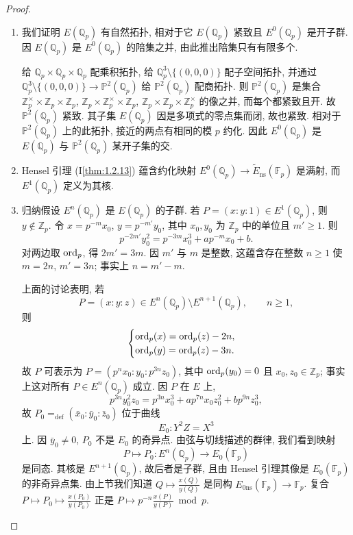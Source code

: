 \begin{proof}\begin{enumerate}[label=\textup{(\alph*)}]

\item 我们证明 $E(\mathbb{Q}_p)$ 有自然拓扑, 相对于它 $E(\mathbb{Q}_p)$ 紧致且 $E^0(\mathbb{Q}_p)$ 是开子群. 因 $E(\mathbb{Q}_p)$ 是 $E^0(\mathbb{Q}_p)$ 的陪集之并, 由此推出陪集只有有限多个.

给 $\mathbb{Q}_p\times\mathbb{Q}_p\times\mathbb{Q}_p$ 配乘积拓扑, 给 $\mathbb{Q}_p^3\setminus\{(0,0,0)\}$ 配子空间拓扑, 并通过 $\mathbb{Q}_p^3\setminus\{(0,0,0)\}\to\mathbb{P}^2(\mathbb{Q}_p)$ 给 $\mathbb{P}^2(\mathbb{Q}_p)$ 配商拓扑. 则 $\mathbb{P}^2(\mathbb{Q}_p)$ 是集合 $\mathbb{Z}_p^{\times}\times\mathbb{Z}_p\times\mathbb{Z}_p$, $\mathbb{Z}_p\times\mathbb{Z}_p^{\times}\times\mathbb{Z}_p$, $\mathbb{Z}_p\times\mathbb{Z}_p\times\mathbb{Z}_p^{\times}$ 的像之并, 而每个都紧致且开. 故 $\mathbb{P}^2(\mathbb{Q}_p)$ 紧致. 其子集 $E(\mathbb{Q}_p)$ 因是多项式的零点集而闭, 故也紧致. 相对于 $\mathbb{P}^2(\mathbb{Q}_p)$ 上的此拓扑, 接近的两点有相同的模 $p$ 约化. 因此 $E^0(\mathbb{Q}_p)$ 是 $E(\mathbb{Q}_p)$ 与 $\mathbb{P}^2(\mathbb{Q}_p)$ 某开子集的交.

\item Hensel 引理 (I\ref{thm:1.2.13}) 蕴含约化映射 $E^0(\mathbb{Q}_p)\to\tilde{E}_{\mathrm{ns}}(\mathbb{F}_p)$ 是满射, 而 $E^1(\mathbb{Q}_p)$ 定义为其核.

\item 归纳假设 $E^n(\mathbb{Q}_p)$ 是 $E(\mathbb{Q}_p)$ 的子群. 若 $P = (x:y:1)\in E^1(\mathbb{Q}_p)$, 则 $y\notin\mathbb{Z}_p$. 令 $x = p^{-m}x_0$, $y = p^{-m'}y_0$, 其中 $x_0, y_0$ 为 $\mathbb{Z}_p$ 中的单位且 $m'\ge 1$. 则
\[
p^{-2m'}y_0^2 = p^{-3m}x_0^3 + ap^{-m}x_0 + b.
\]
对两边取 $\operatorname*{ord}\nolimits_p$, 得 $2m' = 3m$. 因 $m'$ 与 $m$ 是整数, 这蕴含存在整数 $n\ge 1$ 使 $m = 2n$, $m' = 3n$; 事实上 $n = m' - m$.

上面的讨论表明, 若
\[
P = (x:y:z)\in E^n(\mathbb{Q}_p)\setminus E^{n+1}(\mathbb{Q}_p), \qquad n\ge 1,
\]
则
\[
\begin{cases}
\operatorname*{ord}\nolimits_p(x) = \operatorname*{ord}\nolimits_p(z) - 2n,\\
\operatorname*{ord}\nolimits_p(y) = \operatorname*{ord}\nolimits_p(z) - 3n.
\end{cases}
\]
故 $P$ 可表示为 $P = (p^nx_0:y_0:p^{3n}z_0)$, 其中 $\operatorname*{ord}\nolimits_p(y_0) = 0$ 且 $x_0, z_0\in\mathbb{Z}_p$; 事实上这对所有 $P\in E^n(\mathbb{Q}_p)$ 成立. 因 $P$ 在 $E$ 上,
\[
p^{3n}y_0^2z_0 = p^{3n}x_0^3 + ap^{7n}x_0z_0^2 + bp^{9n}z_0^3,
\]
故 $P_0 \mathrel{=_{\mathrm{def}}} (\bar{x}_0:\bar{y}_0:\bar{z}_0)$ 位于曲线
\[
E_0\colon Y^2Z = X^3
\]
上. 因 $\bar{y}_0\neq 0$, $P_0$ 不是 $E_0$ 的奇异点. 由弦与切线描述的群律, 我们看到映射
\[
P\mapsto P_0\colon E^n(\mathbb{Q}_p)\to E_0(\mathbb{F}_p)
\]
是同态. 其核是 $E^{n+1}(\mathbb{Q}_p)$, 故后者是子群, 且由 Hensel 引理其像是 $E_0(\mathbb{F}_p)$ 的非奇异点集. 由上节我们知道 $Q\mapsto\frac{x(Q)}{y(Q)}$ 是同构 $E_{0\mathrm{ns}}(\mathbb{F}_p)\to\mathbb{F}_p$. 复合 $P\mapsto P_0\mapsto\frac{x(P_0)}{y(P_0)}$ 正是 $P\mapsto p^{-n}\frac{x(P)}{y(P)}\bmod p$.


\end{enumerate}
\end{proof}
